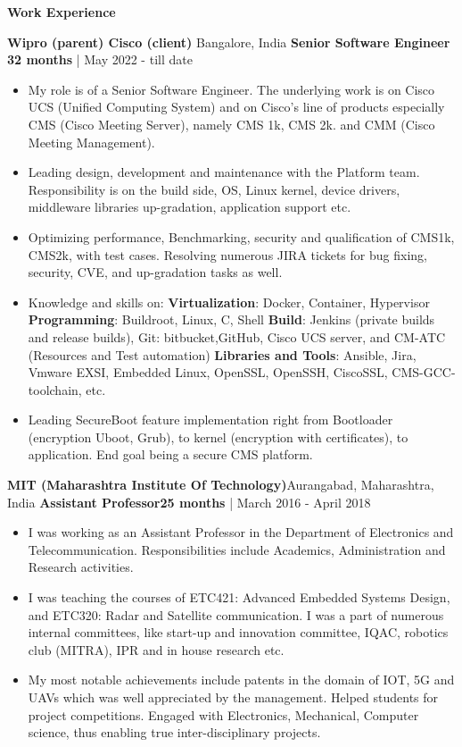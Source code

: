 \begin{center}
    \textbf{Work Experience}
\end{center}

\textbf{Wipro (parent) Cisco (client)} \hfill{Bangalore, India}
\newline
\textbf{Senior Software Engineer} \hfill{\textbf{32 months} | May 2022 - till date}
\begin{itemize}
    \item {My role is  of a Senior Software Engineer. The underlying work is on Cisco UCS (Unified Computing System) and on Cisco's line of products especially CMS (Cisco Meeting Server), namely CMS 1k, CMS 2k. and CMM (Cisco Meeting Management).}
    \item{Leading design, development and maintenance with the Platform team. Responsibility is on the build side, OS, Linux kernel, device drivers, middleware libraries up-gradation, application support etc.}
    \item {Optimizing performance, Benchmarking, security and qualification of CMS1k, CMS2k, with test cases. Resolving numerous JIRA tickets for bug fixing, security, CVE, and up-gradation tasks as well.}
    \item {Knowledge and skills on: \textbf{Virtualization}: Docker, Container, Hypervisor \textbf{Programming}: Buildroot, Linux, C, Shell \textbf{Build}: Jenkins (private builds and release builds), Git: bitbucket,GitHub, Cisco UCS server, and CM-ATC (Resources and Test automation) \textbf{Libraries and Tools}: Ansible, Jira, Vmware EXSI, Embedded Linux, OpenSSL, OpenSSH, CiscoSSL, CMS-GCC-toolchain, etc.}
    \item {Leading SecureBoot feature implementation right from Bootloader (encryption Uboot, Grub), to kernel (encryption with certificates), to application. End goal being a secure CMS platform.}
\end{itemize}

\vspace{12pt}

\textbf{MIT (Maharashtra Institute Of Technology)}\hfill{Aurangabad, Maharashtra, India}
\newline
\textbf{Assistant Professor}\hfill{\textbf{25 months} | March 2016 - April 2018}
            \begin{itemize}
             \item {I was working as an Assistant Professor in the Department of Electronics and Telecommunication.
             Responsibilities include Academics, Administration and Research activities.}
             \item {I was teaching the courses of ETC421: Advanced Embedded Systems Design, and ETC320: Radar and Satellite communication. I was a part of numerous internal committees, like start-up and innovation committee, IQAC, robotics club (MITRA), IPR and in house research etc.}
                \item {My most notable achievements include patents in the domain of IOT, 5G and UAVs which was well appreciated by the management. Helped students for project competitions. Engaged with Electronics, Mechanical, Computer science, thus enabling true inter-disciplinary projects.}
            \end{itemize}

